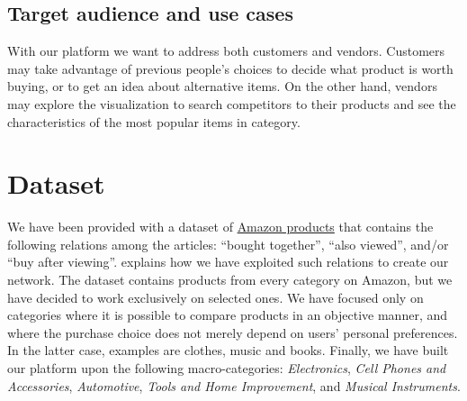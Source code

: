 \documentclass[a4paper,12pt]{article}
\begin{document}
\subsection{Target audience and use cases}
With our platform we want to address both customers and vendors. Customers may take advantage of previous people's choices to decide what product is worth buying, or to get an idea about alternative items. On the other hand, vendors may explore the visualization to search competitors to their products and see the characteristics of the most popular items in category.


\newpage

\section{Dataset}
\label{sec:dataset}
We have been provided with a dataset of \href{http://jmcauley.ucsd.edu/data/amazon/}{Amazon products} that contains the following relations among the articles: ``bought together'', ``also viewed'', and/or ``buy after viewing''.  explains how we have exploited such relations to create our network. The dataset contains products from every category on Amazon, but we have decided to work exclusively on selected ones. We have focused only on categories where it is possible to compare products in an objective manner, and where the purchase choice does not merely depend on users' personal preferences. In the latter case, examples are clothes, music and books. Finally, we have built our platform upon the following macro-categories:  \textit{Electronics}, \textit{Cell Phones and Accessories}, \textit{Automotive}, \textit{Tools and Home Improvement}, and \textit{Musical Instruments}. 

\end{document}
